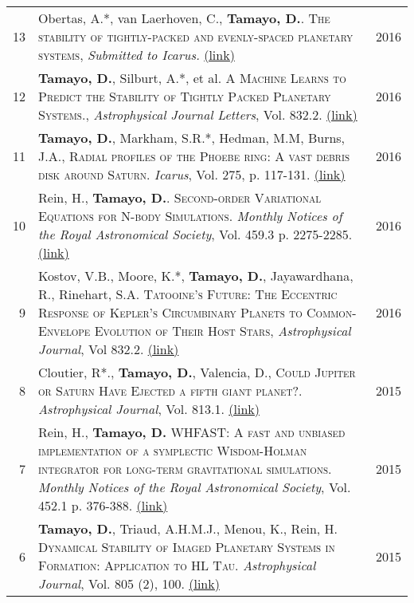 \documentclass[10pt]{article} %
\begin{document}
{\begin{tabular}{>{\hfill}r|p{14.3cm}l}
13 & Obertas, A.*, van Laerhoven, C., {\bf Tamayo, D.}. \textsc{The stability of tightly-packed and evenly-spaced planetary systems}, {\it Submitted to Icarus.} \href{http://cita.utoronto.ca/~dtamayo/stability.pdf}{(link)} & 2016 \\

12 & {\bf Tamayo, D.}, Silburt, A.*, et al. \textsc{A Machine Learns to Predict the Stability of Tightly Packed Planetary Systems.}, {\it Astrophysical Journal Letters}, Vol. 832.2. \href{https://arxiv.org/abs/1610.05359}{(link)}& 2016 \\

11 & {\bf Tamayo, D.}, Markham, S.R.*, Hedman, M.M, Burns, J.A., \textsc{Radial profiles of the Phoebe ring: A vast debris disk around Saturn}.  {\it Icarus}, Vol. 275, p. 117-131. \href{http://arxiv.org/abs/1604.03119}{(link)} & 2016 \\

10 & Rein, H., {\bf Tamayo, D.}. \textsc{Second-order Variational Equations for N-body Simulations.} {\it Monthly Notices of the Royal Astronomical Society}, Vol. 459.3 p. 2275-2285. \href{http://arxiv.org/abs/1603.03424}{(link)} & 2016 \\

9 & Kostov, V.B., Moore, K.*, {\bf Tamayo, D.}, Jayawardhana, R., Rinehart, S.A. \textsc{Tatooine's Future: The Eccentric Response of Kepler's Circumbinary Planets to Common-Envelope Evolution of Their Host Stars}, {\it Astrophysical Journal}, Vol 832.2. \href{https://arxiv.org/abs/1610.03436}{(link)} & 2016 \\

8 & Cloutier, R*., {\bf Tamayo, D.}, Valencia, D., \textsc{Could Jupiter or Saturn Have Ejected a fifth giant planet?}.  {\it Astrophysical Journal}, Vol. 813.1. \href{http://arxiv.org/abs/1509.05397}{(link)} & 2015 \\

7 & Rein, H., {\bf Tamayo, D.} \textsc{WHFAST: A fast and unbiased implementation of a symplectic Wisdom-Holman integrator for long-term gravitational simulations}. {\it Monthly Notices of the Royal Astronomical Society}, Vol. 452.1 p. 376-388. \href{http://arxiv.org/abs/1506.01084}{(link)} & 2015 \\

6 & {\bf Tamayo, D.}, Triaud, A.H.M.J., Menou, K., Rein, H. \textsc{Dynamical Stability of Imaged Planetary Systems in Formation:  Application to HL Tau}. {\it Astrophysical Journal}, Vol. 805 (2), 100. \href{http://arxiv.org/abs/1502.05099}{(link)} & 2015 \\


\end{tabular}}
\end{document}

